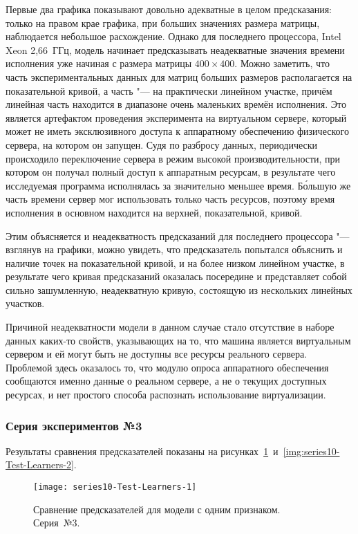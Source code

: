 Первые два графика показывают довольно адекватные в целом предсказания: только на правом крае графика, при больших значениях размера матрицы, наблюдается небольшое расхождение. Однако для последнего процессора, Intel Xeon 2,66~ГГц, модель начинает предсказывать неадекватные значения времени исполнения уже начиная с размера матрицы $400 \times 400$. Можно заметить, что часть экспериментальных данных для матриц больших размеров располагается на показательной кривой, а часть "--- на практически линейном участке, причём линейная часть находится в диапазоне очень маленьких времён исполнения. Это является артефактом проведения эксперимента на виртуальном сервере, который может не иметь эксклюзивного доступа к аппаратному обеспечению физического сервера, на котором он запущен. Судя по разбросу данных, периодически происходило переключение сервера в режим высокой производительности, при котором он получал полный доступ к аппаратным ресурсам, в результате чего исследуемая программа исполнялась за значительно меньшее время. Б\'{о}льшую же часть времени сервер мог использовать только часть ресурсов, поэтому время исполнения в основном находится на верхней, показательной, кривой.

Этим объясняется и неадекватность предсказаний для последнего процессора "--- взглянув на графики, можно увидеть, что предсказатель попытался объяснить и наличие точек на показательной кривой, и на более низком линейном участке, в результате чего кривая предсказаний оказалась посередине и представляет собой сильно зашумленную, неадекватную кривую, состоящую из нескольких линейных участков.

Причиной неадекватности модели в данном случае стало отсутствие в наборе данных каких-то свойств, указывающих на то, что машина является виртуальным сервером и ей могут быть не доступны все ресурсы реального сервера. Проблемой здесь оказалось то, что модулю опроса аппаратного обеспечения сообщаются именно данные о реальном сервере, а не о текущих доступных ресурсах, и нет простого способа распознать использование виртуализации.


\subsubsection{Серия экспериментов №3}

Результаты сравнения предсказателей показаны на рисунках~\ref{img:series10-Test-Learners-1}~и~\ref{img:series10-Test-Learners-2}.

\begin{figure}[H]
    \begin{center}
        \texttt{[image: series10-Test-Learners-1]}
        \caption{Сравнение предсказателей для модели с одним признаком. Серия~№3.} %
        \label{img:series10-Test-Learners-1} %
    \end{center}
\end{figure}

